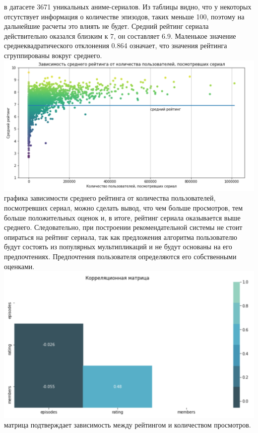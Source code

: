 \documentclass{article}
\newcommand\tab[1][1cm]{\hspace*{#1}}
\begin{document}
 в датасете 3671 уникальных аниме-сериалов. Из таблицы видно, что у некоторых отсутствует информация о количестве эпизодов, таких меньше 100, поэтому на дальнейшие расчеты это влиять не будет. Средний рейтинг сериала действительно оказался близким к 7, он составляет 6.9. Маленькое значение среднеквадратического отклонения 0.864 означает, что значения рейтинга сгруппированы вокруг среднего.\\
\includegraphics[scale=0.7]{f6.png}\\
 графика зависимости среднего рейтинга от количества пользователей, посмотревших сериал, можно сделать вывод, что чем больше просмотров, тем больше положительных оценок и, в итоге, рейтинг сериала оказывается выше среднего. Следовательно, при построении рекомендательной системы не стоит опираться на рейтинг сериала, так как предложения алгоритма пользователю будут состоять из популярных мультипликаций и не будут основаны на его предпочтениях. Предпочтения пользователя определяются его собственными оценками.\\
\tab\includegraphics[scale=0.6]{f7.png}\\
 матрица подтверждает зависимость между рейтингом и количеством просмотров.\\
\end{document}
